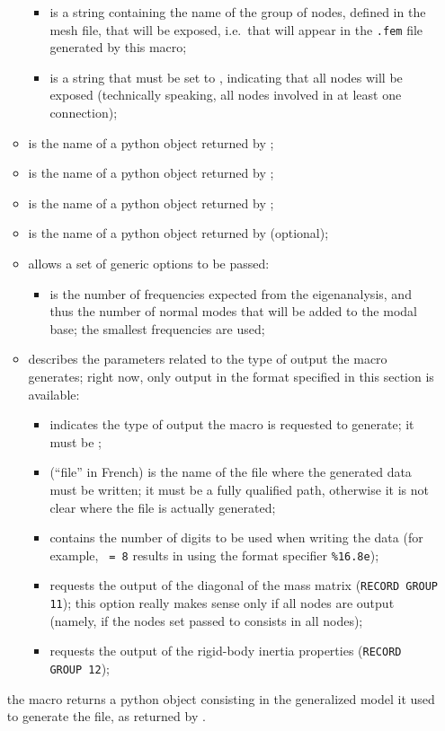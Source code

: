 \begin{enumerate}
\begin{itemize}
\begin{itemize}
	\item {} is a string containing the name
		of the group of nodes, defined in the mesh file,
		that will be exposed, i.e.\ that will appear
		in the \texttt{.fem} file generated by this macro;
	\item {} is a string that must be set to ,
		indicating that all nodes will be exposed
		(technically speaking, all nodes involved
		in at least one connection);
	\end{itemize}
\item {} is the name of a python object
	returned by ;
\item {} is the name of a python object
	returned by ;
\item {} is the name of a python object
	returned by ;
\item {} is the name of a python object
	returned by  (optional);
\item {} allows a set of generic options to be passed:
	\begin{itemize}
	\item {} is the number of frequencies
		expected from the eigenanalysis, and thus the number
		of normal modes that will be added to the modal base;
		the smallest frequencies are used;
	\end{itemize}
\item {} describes the parameters related to the type of output
	the macro generates; right now, only output in the format 
	specified in this section is available:
	\begin{itemize}
	\item {} indicates the type of output the macro
		is requested to generate; it must be ;
	\item {} (``file'' in French) is the name
		of the file where the generated data must be written;
		it must be a fully qualified path, otherwise
		it is not clear where the file is actually generated;
	\item {} contains the number of digits to be used
		when writing the data (for example, \texttt{ = 8}
		results in using the format specifier \texttt{\%16.8e});
	\item {} requests the output of the diagonal
		of the mass matrix (\texttt{RECORD GROUP 11});
		this option really makes
		sense only if all nodes are output (namely, if the nodes
		set passed to  consists in all nodes);
	\item {} requests the output of the rigid-body
		inertia properties (\texttt{RECORD GROUP 12});
	\end{itemize}
\end{itemize}
the macro returns a python object consisting in the generalized model
it used to generate the file, as returned by .


\end{enumerate}
